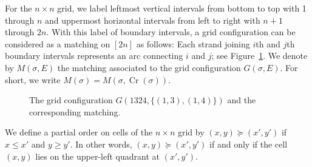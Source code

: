 \documentclass[reqno,12pt]{amsart}
\theoremstyle{definition}
\theoremstyle{remark}
\newcommand\Cr{\operatorname{Cr}}
\newcommand\Xmarking[2]
{\draw[very thick] (#1-0.7,#2-0.7)--(#1-0.3,#2-0.3);
\draw[very thick] (#1-0.7,#2-0.3)--(#1-0.3,#2-0.7);
\draw (#1-1,#2-0.5)--(#1-0.5,#2-0.5);
\draw (#1-0.5,#2-0.5)--(#1-0.5,#2); }
\newcommand\Cross[2]
{\draw (#1-0.5,#2)--(#1-0.5,#2-1);
\draw (#1,#2-0.5)--(#1-1,#2-0.5); }
\newcommand\UP[2]{\draw (#1-0.5,#2)--(#1-0.5,#2-1);}
\newcommand\EAST[2]{\draw (#1,#2-0.5)--(#1-1,#2-0.5);}
\newcommand\Asmooth[2]
{\draw (#1,#2-0.5) .. controls (#1-0.45,#2-0.45) and (#1-0.45,#2-0.45) .. (#1-0.5,#2);
\draw (#1-1,#2-0.5) .. controls (#1-0.55,#2-0.55) and (#1-0.55,#2-0.55) .. (#1-0.5,#2-1); }
\newcommand\Matching[2]{\draw (#1,0) to [out=55,in=125] (#2,0);}
\begin{document}
For the \( n \times n \) grid, we label leftmost vertical intervals
from bottom to top with 1 through $n$ and uppermost horizontal intervals
from left to right with $n+1$ through $2n$.
With this label of boundary intervals, a grid configuration can be considered
as a matching on \( [2n] \) as follows:
Each strand joining $i$th and $j$th boundary intervals represents
an arc connecting $i$ and $j$;
see Figure~\ref{Fig: The grid configuration G(1324, (1,3),(1,4))}.
We denote by $M(\sigma,E)$ the matching associated to the grid configuration
\( G(\sigma,E) \). For short, we write \( M(\sigma) = M(\sigma, \Cr(\sigma)) \).

\begin{figure}
  \centering
  \caption{The grid configuration $G(1324,\{(1,3),(1,4)\})$ and the corresponding matching.}
  \label{Fig: The grid configuration G(1324, (1,3),(1,4))}
\end{figure}

We define a partial order on cells of the $n \times n$ grid
by $(x,y)\succeq (x',y')$ if $x\le x'$ and $y\ge y'$.
In other words, \( (x,y)\succeq (x',y') \) if and only if the cell \( (x,y) \) lies
on the upper-left quadrant at \( (x', y') \).
\end{document}
